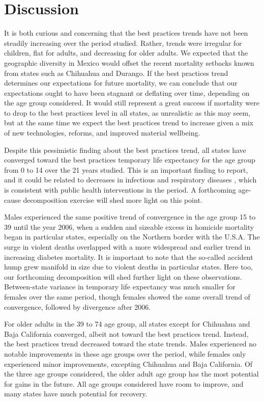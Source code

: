 \documentclass{article}
\begin{document}
\section*{Discussion}
It is both curious and concerning that the best practices trends have not been
steadily increasing over the period studied. Rather, trends were irregular for
children, flat for adults, and decreasing for older adults. We expected
that the geographic diversity in Mexico would offset the recent mortality
setbacks known from states such as Chihuahua and Durango. If the best practices
trend determines our expectations for future mortality, we can conclude that
our expectations ought to have been stagnant or deflating over time, depending
on the age group considered. It would still represent a great success if
mortality were to drop to the best practices level in all states, as unrealistic as this may seem, but at the same time we expect
the best practices trend to increase given a mix of new technologies, reforms,
and improved material wellbeing.

Despite this pessimistic finding about the best practices trend, all states have
converged toward the best practices temporary life expectancy for the age group
from 0 to 14 over the 21 years studied. This is an important finding to report,
and it could be related to decreases in infectious and respiratory diseases
\citep{canudas2014}, which is consistent with public health
interventions in the period. A forthcoming age-cause decomposition exercise will
shed more light on this point.

Males experienced the same positive trend of convergence in the age group 15 to
39 until the year 2006, when a sudden and sizeable excess in homicide mortality
began in particular states, especially on the Northern border with the U.S.A.
The surge in violent deaths overlapped with a more widespread and earlier
trend in increasing diabetes mortality. It is important to note that the
so-called accident hump grew manifold in size due to violent deaths in
particular states. Here too, our forthcoming decomposition
will shed further light on these observations. Between-state variance in
temporary life expectancy was much smaller for females over the same period,
though females showed the same overall trend of convergence, followed by
divergence after 2006.

For older adults in the 39 to 74 age group, all states except for Chihuahua and
Baja California converged, albeit not toward the best practices trend. Instead,
the best practices trend decreased toward the state trends. Males experienced no
notable improvements in these age groups over the period, while females only
experienced minor improvements, excepting Chihuahua and
Baja California. Of the three age groups considered, the older adult age group
has the most potential for gains in the future. All age groups considered have
room to improve, and many states have much potential for recovery.

%
 
\end{document}
